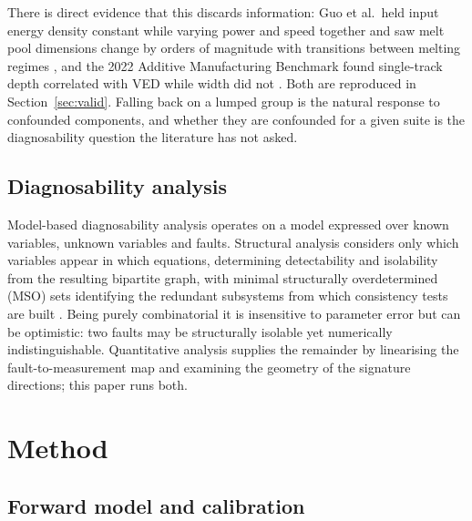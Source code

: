 \documentclass[final,5p,times,twocolumn]{elsarticle}
\begin{document}
There is direct evidence that this discards information: Guo et al.\ held input
energy density constant while varying power and speed together and saw melt pool
dimensions change by orders of magnitude with transitions between melting
regimes \cite{Guo2019}, and the 2022 Additive Manufacturing Benchmark found
single-track depth correlated with VED while width did not \cite{Weaver2024}.
Both are reproduced in Section~\ref{sec:valid}. Falling back on a lumped group is
the natural response to confounded components, and whether they are confounded
for a given suite is the diagnosability question the literature has not asked.

\subsection{Diagnosability analysis}

Model-based diagnosability analysis operates on a model expressed over known
variables, unknown variables and faults. Structural analysis considers only which
variables appear in which equations, determining detectability and isolability
from the resulting bipartite graph, with minimal structurally overdetermined
(MSO) sets identifying the redundant subsystems from which consistency tests are
built \cite{Krysander2008}. Being purely combinatorial it is insensitive to
parameter error but can be optimistic: two faults may be structurally isolable
yet numerically indistinguishable. Quantitative analysis supplies the remainder
by linearising the fault-to-measurement map and examining the geometry of the
signature directions; this paper runs both.

\section{Method}

\subsection{Forward model and calibration}
\end{document}
